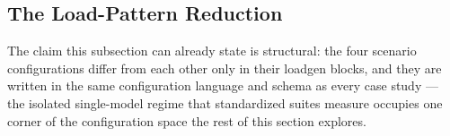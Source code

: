 \subsection{The Load-Pattern Reduction}
\label{sec:results-reduction}

 The claim this subsection can already state
is structural: the four scenario configurations differ from each other only in their
loadgen blocks, and they are written in the same configuration language
and schema as every case study --- the isolated single-model regime that
standardized suites measure occupies one corner of the configuration
space the rest of this section explores.
